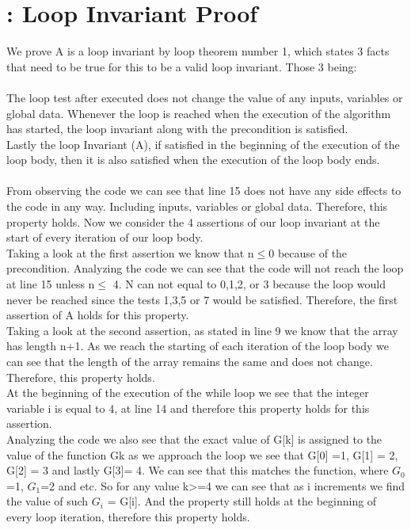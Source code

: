 \documentclass{article}
\begin{document}
    \section{: Loop Invariant Proof}
    We prove A is a loop invariant by loop theorem number 1, which states 3 facts that need to be true for this to be a valid loop invariant. Those 3 being:\\
    \\The loop test after executed does not change the value of any inputs, variables or global data.
    Whenever the loop is reached when the execution of the algorithm has started, the loop invariant along with the precondition is satisfied.\\
    Lastly the loop Invariant (A), if satisfied in the beginning of the execution of the loop body, then it is also satisfied when the execution of the loop body ends.
    \\
    \\From observing the code we can see that line 15  does not have any side effects to the code in any way. Including inputs, variables or global data. Therefore, this property holds.
    Now we consider the 4 assertions of our loop invariant at the start of every iteration of our loop body.\\
    Taking a look at the first assertion we know that n$\leq$0 because of the precondition. Analyzing the code we can see that the code will not reach the loop at line 15 unless n$\leq$ 4. N can not equal to 0,1,2, or 3 because the loop would never be reached since the tests 1,3,5 or 7 would be satisfied. Therefore, the first assertion of A holds for this property.\\
    Taking a look at the second assertion, as stated in line 9 we know that the array has length n+1. As we reach the starting of each iteration of the loop body we can see that the length of the array remains the same and does not change. Therefore, this property holds.\\
    At the beginning of the execution of the while loop we see that the integer variable i is equal to 4, at line 14 and therefore this property holds for this assertion.\\
    Analyzing the code we also see that the exact value of G[k] is assigned to the value of the function Gk as we approach the loop we see that G[0] =1, G[1] = 2, G[2] = 3 and lastly G[3]= 4. We can see that this matches the function, where $G_{0}$=1, $G_{1}$=2 and etc. So for any value k>=4 we can see that as i increments we find the value of such $G_{i}$ = G[i]. And the property still holds at the beginning of every loop iteration, therefore this property holds.\\
\end{document}
